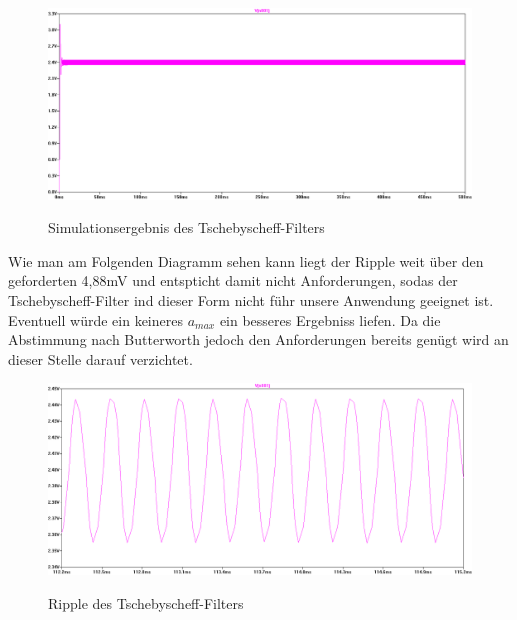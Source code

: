 \documentclass[11pt,twoside,openright]{mpreport}
\begin{document}
\begin{figure}[H]
\centering
\includegraphics[width=.96\textwidth]{plott_ts.png}\\
\caption{Simulationsergebnis des Tschebyscheff-Filters}%
\label{fig:tp-plott-ts}
\end{figure}

Wie man am Folgenden Diagramm sehen kann liegt der Ripple weit über den geforderten 4,88mV  und entspticht damit nicht Anforderungen, sodas
der Tschebyscheff-Filter ind dieser Form nicht führ unsere Anwendung geeignet ist. Eventuell würde ein keineres $a_{max}$ ein besseres Ergebniss
liefen. Da die Abstimmung nach Butterworth jedoch den Anforderungen bereits genügt wird an dieser Stelle darauf verzichtet.

\begin{figure}[H]
\centering
\includegraphics[width=.96\textwidth]{ripple_ts.png}\\
\caption{Ripple des Tschebyscheff-Filters}%
\label{fig:plott_ripple-ts}
\end{figure}

{}

\end{document}
